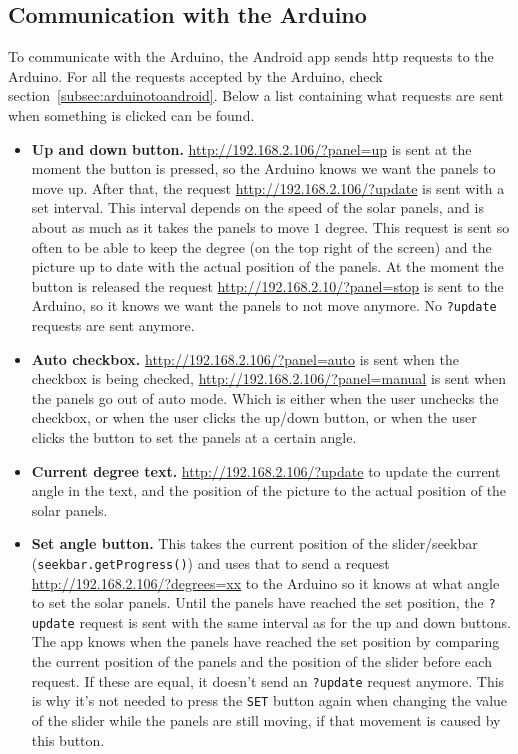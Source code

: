 \documentclass{article}
\begin{document}
		\subsection{Communication with the Arduino}\label{subsec:communicationWithTheArduino}
			To communicate with the Arduino, the Android app sends http requests to the Arduino.
			For all the requests accepted by the Arduino, check section~\ref{subsec:arduinotoandroid}.
			Below a list containing what requests are sent when something is clicked can be found.
			\begin{itemize}
				\item \textbf{Up and down button.} \url{http://192.168.2.106/?panel=up} is sent at the moment the button is pressed, so the Arduino knows we want the panels to move up.
				After that, the request \url{http://192.168.2.106/?update} is sent with a set interval.
				This interval depends on the speed of the solar panels, and is about as much as it takes the panels to move $1$ degree.
				This request is sent so often to be able to keep the degree (on the top right of the screen) and the picture up to date with the actual position of the panels.
				At the moment the button is released the request \url{http://192.168.2.10/?panel=stop} is sent to the Arduino, so it knows we want the panels to not move anymore.
				No \verb|?update| requests are sent anymore.
				
				\item \textbf{Auto checkbox.} \url{http://192.168.2.106/?panel=auto} is sent when the checkbox is being checked, \url{http://192.168.2.106/?panel=manual} is sent when the panels go out of auto mode.
				Which is either when the user unchecks the checkbox, or when the user clicks the up/down button, or when the user clicks the button to set the panels at a certain angle.
				
				\item \textbf{Current degree text.} \url{http://192.168.2.106/?update} to update the current angle in the text, and the position of the picture to the actual position of the solar panels.
				
				\item \textbf{Set angle button.} This takes the current position of the slider/seekbar (\verb|seekbar.getProgress()|) and uses that to send a request \url{http://192.168.2.106/?degrees=xx} to the Arduino so it knows at what angle to set the solar panels.
				Until the panels have reached the set position, the \verb|?update| request is sent with the same interval as for the up and down buttons.
				The app knows when the panels have reached the set position by comparing the current position of the panels and the position of the slider before each request.
				If these are equal, it doesn't send an \verb|?update| request anymore.
				This is why it's not needed to press the \verb|SET| button again when changing the value of the slider while the panels are still moving, if that movement is caused by this button.
			\end{itemize}
	
\end{document}
